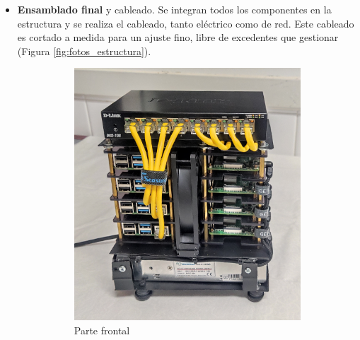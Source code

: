 \begin{itemize}
    \item \textbf{Ensamblado final} y cableado. Se integran todos los componentes en la estructura y se realiza el cableado, tanto eléctrico como de red. Este cableado es cortado a medida para un ajuste fino, libre de excedentes que gestionar (Figura \ref{fig:fotos_estructura}).

    \begin{figure}[h!]
    \centering
    \begin{subfigure}[c]{0.4\textwidth}
        \includegraphics[width=\textwidth]{img/fotos_estructura/front.jpg}
        \caption{Parte frontal}
        \label{fig:fotos_estructura_front}
    \end{subfigure}
    \begin{subfigure}[c]{0.4\textwidth}

\end{subfigure}
\end{figure}
\end{itemize}

